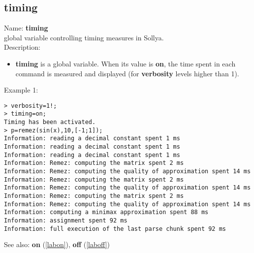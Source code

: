 \subsection{timing}
\label{labtiming}
\noindent Name: \textbf{timing}\\
global variable controlling timing measures in Sollya.\\

\noindent Description: \begin{itemize}

\item \textbf{timing} is a global variable. When its value is \textbf{on}, the time spent in each 
   command is measured and displayed (for \textbf{verbosity} levels higher than 1).
\end{itemize}
\noindent Example 1: 
\begin{center}\begin{minipage}{15cm}\begin{Verbatim}[frame=single]
> verbosity=1!;
> timing=on;
Timing has been activated.
> p=remez(sin(x),10,[-1;1]);
Information: reading a decimal constant spent 1 ms
Information: reading a decimal constant spent 1 ms
Information: reading a decimal constant spent 1 ms
Information: Remez: computing the matrix spent 2 ms
Information: Remez: computing the quality of approximation spent 14 ms
Information: Remez: computing the matrix spent 2 ms
Information: Remez: computing the quality of approximation spent 14 ms
Information: Remez: computing the matrix spent 2 ms
Information: Remez: computing the quality of approximation spent 14 ms
Information: computing a minimax approximation spent 88 ms
Information: assignment spent 92 ms
Information: full execution of the last parse chunk spent 92 ms
\end{Verbatim}
\end{minipage}\end{center}
See also: \textbf{on} (\ref{labon}), \textbf{off} (\ref{laboff})
